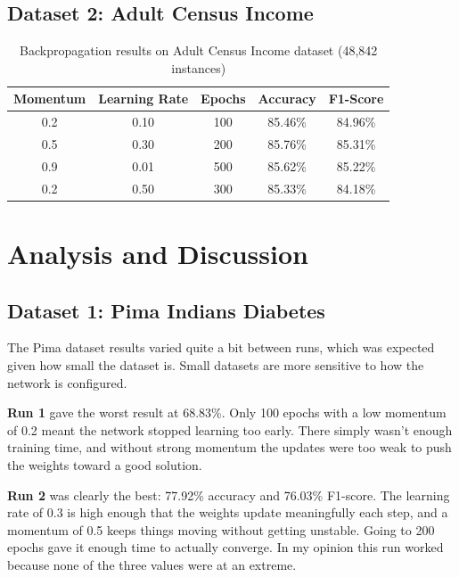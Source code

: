 \documentclass[12pt,a4paper]{article}
\begin{document}
\subsection{Dataset 2: Adult Census Income}

\begin{table}[h]
\centering
\caption{Backpropagation results on Adult Census Income dataset (48,842 instances)}
\label{tab:adult}
\begin{tabular}{ccccc}
\toprule
\textbf{Momentum} & \textbf{Learning Rate} & \textbf{Epochs} & \textbf{Accuracy} & \textbf{F1-Score} \\
\midrule
0.2 & 0.10 & 100 & 85.46\% & 84.96\% \\
0.5 & 0.30 & 200 & 85.76\% & 85.31\% \\
0.9 & 0.01 & 500 & 85.62\% & 85.22\% \\
0.2 & 0.50 & 300 & 85.33\% & 84.18\% \\
\bottomrule
\end{tabular}
\end{table}

\section{Analysis and Discussion}

\subsection{Dataset 1: Pima Indians Diabetes}

The Pima dataset results varied quite a bit between runs, which was expected
given how small the dataset is. Small datasets are more sensitive to how the
network is configured.

\textbf{Run 1} gave the worst result at 68.83\%. Only 100 epochs with a low
momentum of 0.2 meant the network stopped learning too early. There simply
wasn't enough training time, and without strong momentum the updates were too
weak to push the weights toward a good solution.

\textbf{Run 2} was clearly the best: 77.92\% accuracy and 76.03\% F1-score.
The learning rate of 0.3 is high enough that the weights update meaningfully
each step, and a momentum of 0.5 keeps things moving without getting unstable.
Going to 200 epochs gave it enough time to actually converge. In my opinion
this run worked because none of the three values were at an extreme.
\end{document}

